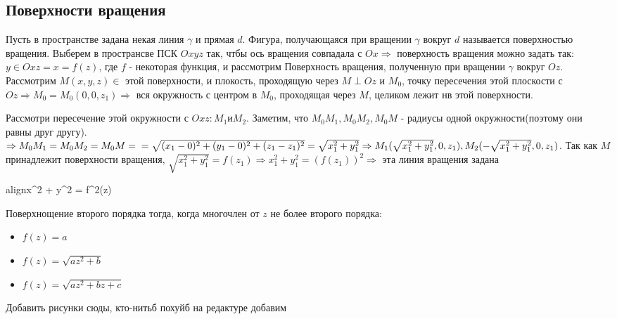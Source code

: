 \documentclass[oneside]{book}
\newcommand{\boxedeq}[2]{\begin{empheq}[box={\fboxsep=6pt\fbox}]{align}\label{#1}#2\end{empheq}}
\begin{document}
\begin{enumerate}
\begin{itemize}
\begin{enumerate}
\chapter {Поверхности вращения\\}
Пусть в пространстве задана некая линия $\gamma$ и прямая $d$. Фигура, получающаяся при вращении $\gamma$ вокруг $d$ называется поверхностью вращения.
Выберем в пространсве ПСК $Oxyz$ так, чтбы ось вращения совпадала с $Ox \Rightarrow$ поверхность вращения можно задать так:
$y \in Oxz = x = f(z)$, где $f$ - некоторая функция, и рассмотрим Поверхность вращения, полученную при вращении $\gamma$ вокруг $Oz$.
Рассмотрим $M(x, y, z) \in $ этой поверхности, и плокость, проходящую через $M \perp Oz$ и $M_0$, точку пересечения этой плоскости с $Oz \Rightarrow M_0 = M_0(0, 0, z_1) \Rightarrow $ вся окружность с центром в $M_0$, проходящая через $M$, целиком лежит нв этой поверхности. \par Рассмотри пересечение этой окружности с $Oxz: M_1 $и$ M_2$.
Заметим, что $M_0 M_1, M_0 M_2, M_0 M$ - радиусы одной окружности(поэтому они равны друг другу). $\Rightarrow M_0 M_1 = M_0 M_2 = M_0 M = \\ = \sqrt{(x_1 - 0)^2 + (y_1 - 0)^2 + (z_1-z_1)^2} = \sqrt{x_1^2 + y_1^2} \\ \Rightarrow M_1(\sqrt{x_1^2 + y_1^2}, 0, z_1), M_2(-\sqrt{x_1^2 + y_1^2}, 0, z_1)$. Так как $M$ принадлежит поверхности вращения, $\sqrt{x_1^2 + y_1^2} = f(z_1) \Rightarrow x_1^2 + y_1^2 = (f(z_1))^2 \Rightarrow $ эта линия вращения задана
\boxedeq{eq:*}{x^2 + y^2 = f^2(z)}
Поверхнощение второго порядка тогда, когда многочлен от $z$ не более второго порядка:
\begin{itemize}
  \item $f(z) = a$
  \item $f(z) = \sqrt{az^2 + b}$
  \item $f(z) = \sqrt{az^2 + bz + c}$
\end{itemize}
{\Large Добавить рисунки сюды, кто-нитьб похуйб на редактуре добавим}


\end{enumerate}
\end{itemize}
\end{enumerate}
\end{document}
